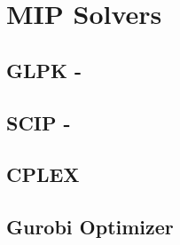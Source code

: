 \chapter{MIP Solvers}
\label{cap:solv}

\section{GLPK - }
\label{sec:glpk}

\section{SCIP - }
\label{sec:scip}

\section{CPLEX}
\label{sec:cplex}

\section{Gurobi Optimizer}
\label{sec:gurobi}